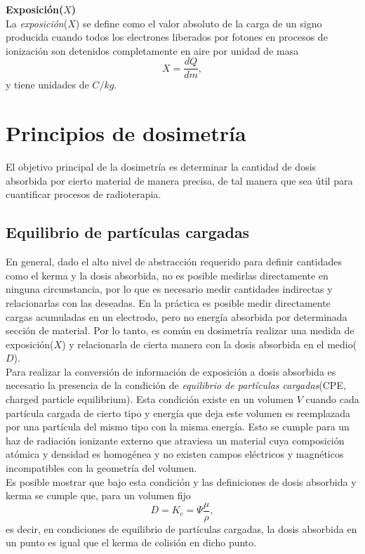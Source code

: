 \noindent
\textbf{Exposición($X$)}\\

La \textit{exposición}($X$) se define como el valor absoluto de la carga de un signo producida cuando todos los electrones liberados por fotones en procesos de ionización son detenidos completamente en aire por unidad de masa
\begin{equation}
X=\frac{dQ}{dm},
\end{equation}
y tiene unidades de $C/kg$.
\section{Principios de dosimetría}
El objetivo principal de la dosimetría es determinar la cantidad de dosis absorbida por cierto material de manera precisa, de tal manera que sea útil para cuantificar procesos de radioterapia.
\subsection{Equilibrio de partículas cargadas}
En general, dado el alto nivel de abstracción requerido para definir cantidades como el kerma y la dosis absorbida, no es posible medirlas directamente en ninguna circunstancia, por lo que es necesario medir cantidades indirectas y relacionarlas con las deseadas. En la práctica es posible medir directamente cargas acumuladas en un electrodo, pero no energía absorbida por determinada sección de material. Por lo tanto, es común en dosimetría realizar una medida de exposición($X$) y relacionarla de cierta manera con la dosis absorbida en el medio($D$).\\

Para realizar la conversión de información de exposición a dosis absorbida es necesario la presencia de la condición de \textit{equilibrio de partículas cargadas}(CPE, charged particle equilibrium). Esta condición existe en un volumen $V$ cuando cada partícula cargada de cierto tipo y energía que deja este volumen es reemplazada por una partícula del mismo tipo con la misma energía.  Esto se cumple para un haz de radiación ionizante externo que atraviesa un material cuya composición atómica y densidad es homogénea y no existen campos eléctricos y magnéticos incompatibles con la geometría del volumen.\\

Es posible mostrar \cite{Attix1986} que bajo esta condición y las definiciones de dosis absorbida y kerma se cumple que, para un volumen fijo 
\begin{equation}
	D=K_c=\Psi \frac{\mu }{\rho},
\end{equation}
es decir, en condiciones de equilibrio de partículas cargadas, la dosis absorbida en un punto es igual que el kerma de colisión en dicho punto.\\

